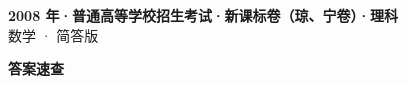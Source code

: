 \documentclass[zihao=-4, a4paper]{ctexart}
\begin{document}
\begin{center}
  {\Large\bfseries 2008 年·普通高等学校招生考试·新课标卷（琼、宁卷）·理科}\\[4pt]
  {\large 数学 · 简答版}
\end{center}
\medskip
{}

\clearpage
{}
\begin{center}{\Large\bfseries 答案速查}\end{center}
\medskip

\end{document}
